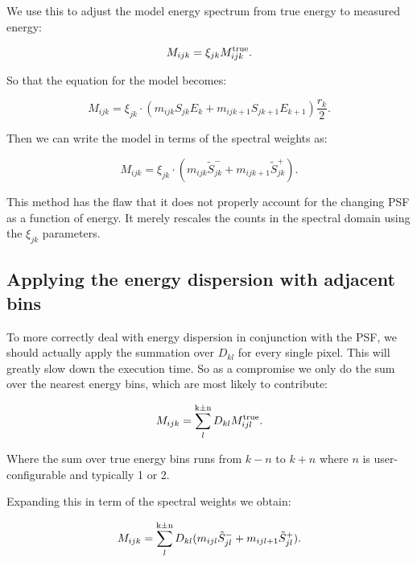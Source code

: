 \documentclass[preprint]{aastex}
\begin{document}
\noindent We use this to adjust the model energy spectrum from true
energy to measured energy:

\begin{equation}
  M_{ijk} = \xi_{jk} M_{ijk}^{\rm true}.
\end{equation}

\noindent So that the equation for the model becomes:

\begin{equation}
  M_{ijk} = \xi_{jk} \cdot (m_{ijk} S_{jk} E_k +  m_{ijk+1} S_{jk+1} E_{k+1}) \frac{r_k}{2}.
\end{equation}

\noindent Then we can write the model in terms of the spectral weights as:

\begin{equation}
  M_{ijk} =  \xi_{jk} \cdot (m_{ijk} \tilde{S}_{jk}^{-}  + m_{ijk+1} \tilde{S}_{jk}^{+}).
\end{equation}

This method has the flaw that it does not properly account for the changing PSF as 
a function of energy.  It merely rescales the counts in the spectral domain using
the $\xi_{jk}$ parameters.


\subsection{Applying the energy dispersion with adjacent bins}\label{subsec:like_model_edisp_1}

To more correctly deal with energy dispersion in conjunction with the PSF, we should
actually apply the summation over $D_{kl}$ for every single pixel.  This will greatly 
slow down the execution time.  So as a compromise we only do the sum over the nearest
energy bins, which are most likely to contribute:

\begin{equation}
  M_{ijk} = \sum_l^{\rm k\pm n} D_{kl} M_{ijl}^{\rm true}.
\end{equation}

\noindent Where the sum over true energy bins runs from $k-n$ to $k+n$ where $n$ is user-configurable and
typically 1 or 2.

Expanding this in term of the spectral weights we obtain:

\begin{equation}
  M_{ijk} = \sum_l^{\rm k\pm n} D_{kl} (m_{ijl} \tilde{S}_{jl}^{-}  + m_{ijl+1} \tilde{S}_{jl}^{+}).
\end{equation}
\end{document}
